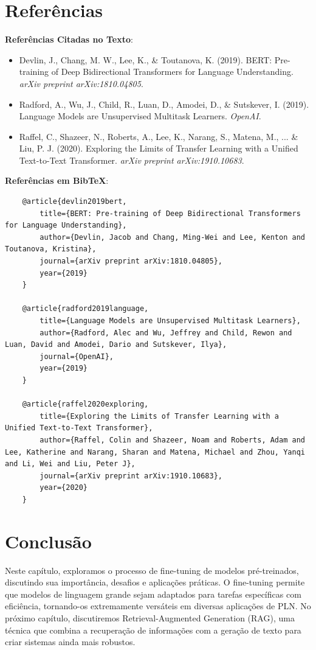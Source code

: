 \documentclass[14pt,a4paper,oneside]{book}
\begin{document}
\section{Referências}

\textbf{Referências Citadas no Texto}:

\begin{itemize}
	\item Devlin, J., Chang, M. W., Lee, K., \& Toutanova, K. (2019). BERT: Pre-training of Deep Bidirectional Transformers for Language Understanding. \textit{arXiv preprint arXiv:1810.04805}.
	\item Radford, A., Wu, J., Child, R., Luan, D., Amodei, D., \& Sutskever, I. (2019). Language Models are Unsupervised Multitask Learners. \textit{OpenAI}.
	\item Raffel, C., Shazeer, N., Roberts, A., Lee, K., Narang, S., Matena, M., ... \& Liu, P. J. (2020). Exploring the Limits of Transfer Learning with a Unified Text-to-Text Transformer. \textit{arXiv preprint arXiv:1910.10683}.
\end{itemize}

\textbf{Referências em BibTeX}:

\begin{verbatim}
	@article{devlin2019bert,
		title={BERT: Pre-training of Deep Bidirectional Transformers for Language Understanding},
		author={Devlin, Jacob and Chang, Ming-Wei and Lee, Kenton and Toutanova, Kristina},
		journal={arXiv preprint arXiv:1810.04805},
		year={2019}
	}
	
	@article{radford2019language,
		title={Language Models are Unsupervised Multitask Learners},
		author={Radford, Alec and Wu, Jeffrey and Child, Rewon and Luan, David and Amodei, Dario and Sutskever, Ilya},
		journal={OpenAI},
		year={2019}
	}
	
	@article{raffel2020exploring,
		title={Exploring the Limits of Transfer Learning with a Unified Text-to-Text Transformer},
		author={Raffel, Colin and Shazeer, Noam and Roberts, Adam and Lee, Katherine and Narang, Sharan and Matena, Michael and Zhou, Yanqi and Li, Wei and Liu, Peter J},
		journal={arXiv preprint arXiv:1910.10683},
		year={2020}
	}
\end{verbatim}

\section{Conclusão}

Neste capítulo, exploramos o processo de fine-tuning de modelos pré-treinados, discutindo sua importância, desafios e aplicações práticas. O fine-tuning permite que modelos de linguagem grande sejam adaptados para tarefas específicas com eficiência, tornando-os extremamente versáteis em diversas aplicações de PLN. No próximo capítulo, discutiremos Retrieval-Augmented Generation (RAG), uma técnica que combina a recuperação de informações com a geração de texto para criar sistemas ainda mais robustos.
\end{document}
